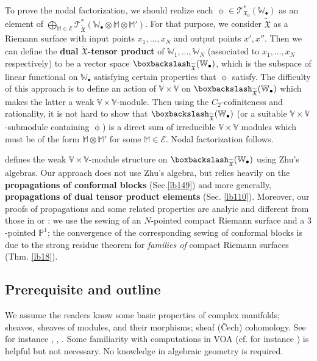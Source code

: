 \documentclass[12pt,b5paper,notitlepage]{report}
\theoremstyle{definition}
\theoremstyle{plain}
\newcommand{\fk}{\mathfrak}
\newcommand{\mc}{\mathcal}
\newcommand{\wtd}{\widetilde}
\newcommand{\scr}{\mathscr}
\newcommand{\blt}{\bullet}
\newcommand{\Vbb}{\mathbb V}
\newcommand{\Wbb}{\mathbb W}
\newcommand{\Mbb}{\mathbb M}
\newcommand{\Pbb}{\mathbb P}
\numberwithin{equation}{section}
\begin{document}
To prove the nodal factorization, we should realize each $\upphi\in\scr T_{\fk X_0}^*(\Wbb_\blt)$ as an element of $\bigoplus_{\Mbb\in\mc E}\scr T_{\wtd{\fk X}}^*(\Wbb_\blt\otimes\Mbb\otimes\Mbb')$. For that purpose, we consider $\wtd{\fk X}$ as a Riemann surface with input points $x_1,\dots,x_N$ and output points $x',x''$.  Then we can define the \textbf{dual $\wtd{\fk X}$-tensor product} of $\Wbb_1,\dots,\Wbb_N$ (associated to $x_1,\dots,x_N$ respectively) to be a vector space $\boxbackslash_{\wtd{\fk X}}(\Wbb_\blt)$, which is the subspace of linear functional on $\Wbb_\blt$ satisfying certain properties that $\upphi$ satisfy. The difficulty of this approach is to define an action of $\Vbb\times\Vbb$ on $\boxbackslash_{\wtd{\fk X}}(\Wbb_\blt)$ which makes the latter a weak $\Vbb\times\Vbb$-module. Then using the $C_2$-cofiniteness and rationality, it is not hard to show that  $\boxbackslash_{\wtd{\fk X}}(\Wbb_\blt)$ (or a suitable $\Vbb\times\Vbb$-submodule containing $\upphi$) is a direct sum of irreducible $\Vbb\times\Vbb$ modules which must be of the form $\Mbb\otimes\Mbb'$ for some $\Mbb\in\mc E$. Nodal factorization follows.

\cite{DGT19b} defines the weak $\Vbb\times\Vbb$-module structure on $\boxbackslash_{\wtd{\fk X}}(\Wbb_\blt)$ using Zhu's algebras. Our approach does not use Zhu's algebra, but relies heavily on the \textbf{propagations of conformal blocks} (Sec.\ref{lb149}) and more generally, \textbf{propagations  of dual tensor product elements} (Sec. \ref{lb110}). Moreover, our proofs of propagations and some related properties are analyic and different from those in \cite{FB04} or \cite{DGT19b}: we use the sewing of an $N$-pointed compact Riemann surface and a $3$-pointed $\Pbb^1$; the convergence of the corresponding sewing of conformal blocks is due to  the strong residue theorem for \emph{families of} compact Riemann surfaces (Thm. \ref{lb18}).




\subsection*{Prerequisite and outline}

We assume the readers know some basic properties of complex manifolds; sheaves,  sheaves of modules, and their morphisms; sheaf (\v Cech) cohomology. See for instance \cite[Sec. 0.2, 0.3]{GH78}, \cite[Chapter B]{Huy06}, \cite[Annex]{GR84}. Some familiarity with computations in VOA (cf. for instance \cite{FHL93}) is helpful but not necessary. No knowledge in algebraic geometry is required.
\end{document}

